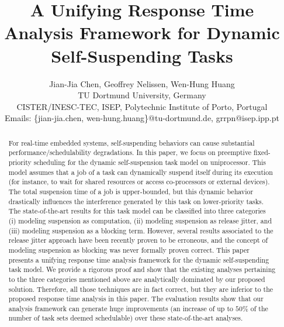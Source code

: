 \documentclass[conference]{IEEEtran}
\begin{document}
  
\title{A Unifying Response Time Analysis Framework for Dynamic Self-Suspending Tasks}


\author{
Jian-Jia Chen, Geoffrey Nelissen, Wen-Hung Huang\\
 TU Dortmund University, Germany\\
 CISTER/INESC-TEC, ISEP, Polytechnic Institute of Porto, Portugal \\
Emails: \{jian-jia.chen, wen-hung.huang\}@tu-dortmund.de, grrpn@isep.ipp.pt\\
}

\maketitle

\begin{abstract}
  For real-time embedded systems, self-suspending behaviors can cause
  substantial performance/schedulability degradations. In this paper,
  we focus on preemptive fixed-priority scheduling for the dynamic
  self-suspension task model on uniprocessor. This
  model assumes that a job of a task can dynamically suspend itself during its execution (for instance, to wait for shared resources or access co-processors or external devices).
  The total suspension time of a job is upper-bounded, but this dynamic behavior drastically influences the interference generated by this task on lower-priority tasks. The state-of-the-art results for this task model can be classified
  into three categories (i) modeling suspension as computation, (ii)
  modeling suspension as release jitter, and (iii) modeling suspension as a blocking term.
  However, several results associated to the release jitter approach have been recently proven to be erroneous, and the concept of modeling suspension as blocking was never
  formally proven correct. This paper presents a unifying
  response time analysis framework for the dynamic self-suspending
  task model. We provide a rigorous proof and show that the existing analyses pertaining to the three categories mentioned above are analytically dominated by our proposed solution. Therefore, all those techniques are in fact correct, but they are
  inferior to the proposed response time analysis in this paper. The
  evaluation results show that our analysis framework can generate huge
  improvements (an increase of up to $50\%$ of the number of task sets
  deemed schedulable) over these state-of-the-art analyses.
\end{abstract}
\end{document}
